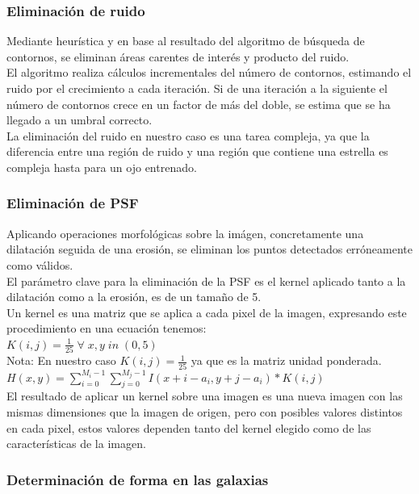 	\subsubsection{Eliminación de ruido}
	Mediante heurística y en base al resultado del algoritmo de búsqueda de contornos, se eliminan áreas carentes de interés y producto del ruido.
	\\El algoritmo realiza cálculos incrementales del número de contornos, estimando el ruido por el crecimiento a cada iteración. Si de una iteración a la siguiente el número de contornos crece en un factor de más del doble, se estima que se ha llegado a un umbral correcto.
	\\
	La eliminación del ruido en nuestro caso es una tarea compleja, ya que la diferencia entre una región de ruido y una región que contiene una estrella es compleja hasta para un ojo entrenado.
	\subsubsection{Eliminación de PSF}
    Aplicando operaciones morfológicas sobre la imágen, concretamente una dilatación seguida de una erosión, se eliminan los puntos detectados erróneamente como válidos.
    \\
    El parámetro clave para la eliminación de la PSF es el kernel aplicado tanto a la dilatación como a la erosión, es de un tamaño de 5.
    \\
    Un kernel es una matriz que se aplica a cada pixel de la imagen, expresando este procedimiento en una ecuación tenemos:\\ \newline
    $ K(i,j) = \frac{1}{25} \; \forall\; x,y \; in \; (0,5)$\\ \newline
    \scriptsize Nota: En nuestro caso $K(i,j)=\frac{1}{25}$ ya que es la matriz unidad ponderada.\\ \newline
    $ H(x,y) = \sum_{i=0}^{M_{i}-1}\sum_{j=0}^{M_{j}-1}I(x+i-a_{i},y+j-a_{i})*K(i,j) $
	\\
	El resultado de aplicar un kernel sobre una imagen es una nueva imagen con las mismas dimensiones que la imagen de origen, pero con posibles valores distintos en cada pixel, estos valores dependen tanto del kernel elegido como de las características de la imagen.
	\\
	\subsubsection{Determinación de forma en las galaxias}

